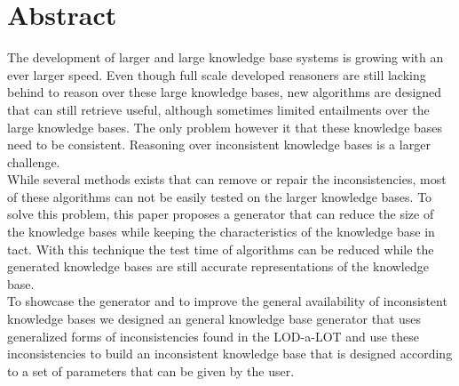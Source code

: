 \documentclass{article}
\begin{document}
\section*{Abstract}
The development of larger and large knowledge base systems is growing with an ever larger speed. Even though full scale developed reasoners are still lacking behind to reason over these large knowledge bases, new algorithms are designed that can still retrieve useful, although sometimes limited entailments over the large knowledge bases. The only problem however it that these knowledge bases need to be consistent. Reasoning over inconsistent knowledge bases is a larger challenge. \\
While several methods exists that can remove or repair the inconsistencies, most of these algorithms can not be easily tested on the larger knowledge bases. To solve this problem, this paper proposes a generator that can reduce the size of the knowledge bases while keeping the characteristics of the knowledge base in tact. With this technique the test time of algorithms can be reduced while the generated knowledge bases are still accurate representations of the knowledge base.\\
To showcase the generator and to improve the general availability of inconsistent knowledge bases we designed an general knowledge base generator that uses generalized forms of inconsistencies found in the LOD-a-LOT \cite{JavierD:2017} and use these inconsistencies to build an inconsistent knowledge base that is designed according to a set of parameters that can be given by the user.\\


\newpage
\tableofcontents
\newpage
{}
\end{document}
